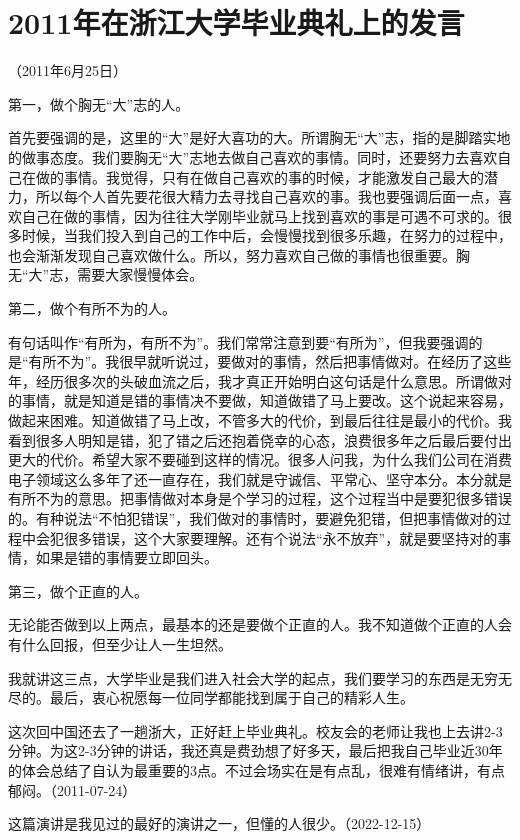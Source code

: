 
\section{2011年在浙江大学毕业典礼上的发言}

（2011年6月25日）

第一，做个胸无“大”志的人。

首先要强调的是，这里的“大”是好大喜功的大。所谓胸无“大”志，指的是脚踏实地的做事态度。我们要胸无“大”志地去做自己喜欢的事情。同时，还要努力去喜欢自己在做的事情。我觉得，只有在做自己喜欢的事的时候，才能激发自己最大的潜力，所以每个人首先要花很大精力去寻找自己喜欢的事。我也要强调后面一点，喜欢自己在做的事情，因为往往大学刚毕业就马上找到喜欢的事是可遇不可求的。很多时候，当我们投入到自己的工作中后，会慢慢找到很多乐趣，在努力的过程中，也会渐渐发现自己喜欢做什么。所以，努力喜欢自己做的事情也很重要。胸无“大”志，需要大家慢慢体会。

第二，做个有所不为的人。

有句话叫作“有所为，有所不为”。我们常常注意到要“有所为”，但我要强调的是“有所不为”。我很早就听说过，要做对的事情，然后把事情做对。在经历了这些年，经历很多次的头破血流之后，我才真正开始明白这句话是什么意思。所谓做对的事情，就是知道是错的事情决不要做，知道做错了马上要改。这个说起来容易，做起来困难。知道做错了马上改，不管多大的代价，到最后往往是最小的代价。我看到很多人明知是错，犯了错之后还抱着侥幸的心态，浪费很多年之后最后要付出更大的代价。希望大家不要碰到这样的情况。很多人问我，为什么我们公司在消费电子领域这么多年了还一直存在，我们就是守诚信、平常心、坚守本分。本分就是有所不为的意思。把事情做对本身是个学习的过程，这个过程当中是要犯很多错误的。有种说法“不怕犯错误”，我们做对的事情时，要避免犯错，但把事情做对的过程中会犯很多错误，这个大家要理解。还有个说法“永不放弃”，就是要坚持对的事情，如果是错的事情要立即回头。

第三，做个正直的人。

无论能否做到以上两点，最基本的还是要做个正直的人。我不知道做个正直的人会有什么回报，但至少让人一生坦然。

我就讲这三点，大学毕业是我们进入社会大学的起点，我们要学习的东西是无穷无尽的。最后，衷心祝愿每一位同学都能找到属于自己的精彩人生。

这次回中国还去了一趟浙大，正好赶上毕业典礼。校友会的老师让我也上去讲2-3分钟。为这2-3分钟的讲话，我还真是费劲想了好多天，最后把我自己毕业近30年的体会总结了自认为最重要的3点。不过会场实在是有点乱，很难有情绪讲，有点郁闷。（2011-07-24）

这篇演讲是我见过的最好的演讲之一，但懂的人很少。（2022-12-15）
